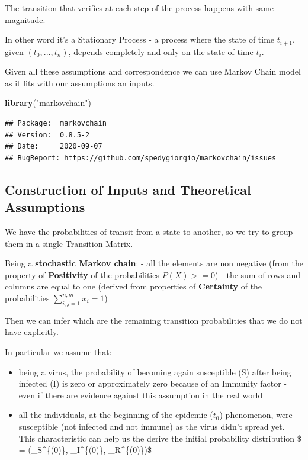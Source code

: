 \documentclass[
]{article}
\newenvironment{Shaded}{\begin{snugshade}}{\end{snugshade}}
\newcommand{\KeywordTok}[1]{\textcolor[rgb]{0.13,0.29,0.53}{\textbf{#1}}}
\newcommand{\NormalTok}[1]{#1}
\newcommand{\StringTok}[1]{\textcolor[rgb]{0.31,0.60,0.02}{#1}}
\begin{document}
The transition that verifies at each step of the process happens with
same magnitude.

In other word it's a Stationary Process - a process where the state of
time \(t_{i+1}\), given \((t_0,...,t_n)\), depends completely and only
on the state of time \(t_{i}\).

Given all these assumptions and correspondence we can use Markov Chain
model as it fits with our assumptions an inputs.

\begin{Shaded}
\begin{Highlighting}[]
\KeywordTok{library}\NormalTok{(}\StringTok{"markovchain"}\NormalTok{)}
\end{Highlighting}
\end{Shaded}

\begin{verbatim}
## Package:  markovchain
## Version:  0.8.5-2
## Date:     2020-09-07
## BugReport: https://github.com/spedygiorgio/markovchain/issues
\end{verbatim}

\hypertarget{construction-of-inputs-and-theoretical-assumptions}{%
\subsection{Construction of Inputs and Theoretical
Assumptions}\label{construction-of-inputs-and-theoretical-assumptions}}

We have the probabilities of transit from a state to another, so we try
to group them in a single Transition Matrix.

Being a \textbf{stochastic Markov chain}: - all the elements are non
negative (from the property of \textbf{Positivity} of the probabilities
\(P(X)>=0\)) - the sum of rows and columns are equal to one (derived
from properties of \textbf{Certainty} of the probabilities
\(\sum_{i,j=1}^{n,m} x_i = 1\))

Then we can infer which are the remaining transition probabilities that
we do not have explicitly.

In particular we assume that:

\begin{itemize}
\item
  being a virus, the probability of becoming again susceptible (S) after
  being infected (I) is zero or approximately zero because of an
  Immunity factor - even if there are evidence against this assumption
  in the real world
\item
  all the individuals, at the beginning of the epidemic (\(t_0\))
  phenomenon, were susceptible (not infected and not immune) as the
  virus didn't spread yet. This characteristic can help us the derive
  the initial probability distribution \$ \mu = (\mu\_S\^{}\{(0)\},
  \mu\_I\^{}\{(0)\}, \mu\_R\^{}\{(0)\})\$
\end{itemize}
\end{document}
